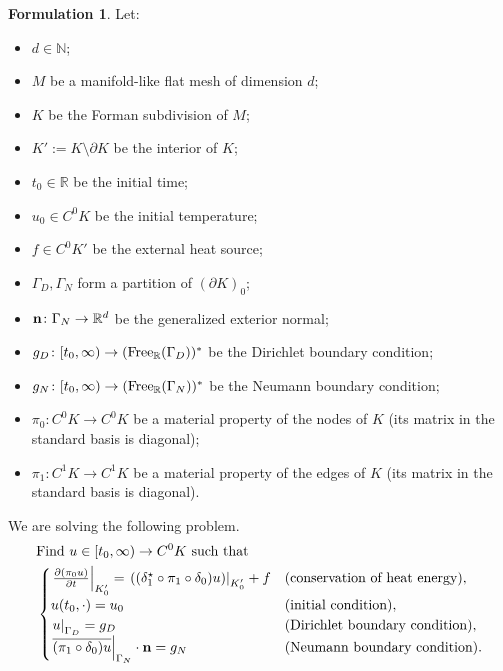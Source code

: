 \documentclass[fleqn]{article}
\theoremstyle{definition}
\newtheorem{formulation}[theorem]{Formulation}
\newcommand{\N}{\mathbb{N}}
\newcommand{\R}{\mathbb{R}}
\newcommand{\restrict}[2]{\left. #1 \right|_{#2}}
\begin{document}
\begin{formulation}
  \label{idec/discrete_heat_transport/phenomenon-formulation}
  Let:
  \begin{itemize}
    \item
      $d \in \N$;
    \item
      $M$ be a manifold-like flat mesh of dimension $d$;
    \item
      $K$ be the Forman subdivision of $M$;
    \item
      $K' := K \setminus \partial K$ be the interior of $K$;
    \item
      $t_0 \in \R$ be the initial time;
    \item
      $u_0 \in C^0 K$ be the initial temperature;
    \item
      $f \in C^0 K'$ be the external heat source;
    \item
      $\Gamma_D, \Gamma_N$ form a partition of $(\partial K)_0$;
    \item
      ${\bf n} \colon \Gamma_N \to \R^d$ be the generalized exterior normal;
    \item
      $g_D \colon [t_0, \infty) \to ({\rm Free}_\R(\Gamma_D))^*$
      be the Dirichlet boundary condition;
    \item
      $g_N \colon [t_0, \infty) \to ({\rm Free}_\R(\Gamma_N))^*$
      be the Neumann boundary condition;
    \item
      $\pi_0 \colon C^0 K \to C^0 K$ be a material property of the nodes of $K$
      (its matrix in the standard basis is diagonal);
    \item
      $\pi_1 \colon C^1 K \to C^1 K$ be a material property of the edges of $K$
      (its matrix in the standard basis is diagonal).
  \end{itemize}
  We are solving the following problem.
  \begin{equation}
    \begin{split}
      & \text{Find $u \in [t_0, \infty) \to C^0 K$ such that} \\
      &
      \begin{cases}
        \restrict{\frac{\partial (\pi_0 u)}{\partial t}}{K'_0} =
        \restrict{((\delta_1^\star \circ \pi_1 \circ \delta_0) u)}{K'_0} + f
        & (\text{conservation of heat energy}), \\
%
        u(t_0, \cdot) = u_0
        & (\text{initial condition}), \\
%
        \restrict{u}{\Gamma_D} = g_D
        & (\text{Dirichlet boundary condition}), \\
%
        \restrict{\overline{(\pi_1 \circ \delta_0) u}}{\Gamma_N}
        \cdot {\bf n} = g_N
        & (\text{Neumann boundary condition}).
      \end{cases}
    \end{split}
  \end{equation}
\end{formulation}
\end{document}

